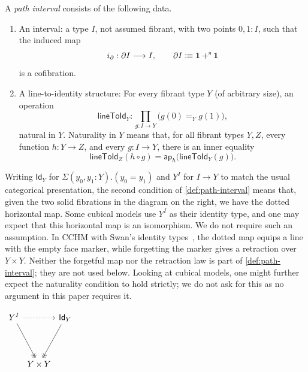 \begin{definition}\label{def:path-interval}
	A \emph{path interval} consists of the following data.
	\begin{enumerate}
		\item An interval: a type $I$, not assumed fibrant, with two points $0, 1: I$, such that the induced map
		\[
		i_\partial:\partial I\longrightarrow I,
		\qquad \partial I \mathrel{\vcentcolon\mspace{-1mu}\equiv} \mathbf{1} +^{\mathrm{s}} \mathbf{1}
		\]
		is a cofibration.
		\item A line-to-identity structure: For every fibrant type \(Y\) (of arbitrary size), an operation
		\[
		\mathsf{lineToId}_Y:
		\prod_{g:I\to Y}\bigl(g(0)=_Y g(1)\bigr),
		\]
		natural in \(Y\). Naturality in \(Y\) means that, for all fibrant types \(Y,Z\), every function
		\(h:Y\to Z\), and every \(g:I\to Y\), there is an inner equality
		\[
		\mathsf{lineToId}_Z(h\circ g)
		=
		\mathsf{ap}_h\bigl(\mathsf{lineToId}_Y(g)\bigr).
		\]
	\end{enumerate}
\end{definition}



\noindent
\begin{minipage}[t]{0.755\textwidth}
\begin{remark}\label{rem:path-interval-diagram}
Writing $\mathsf{Id}_Y$ for $\Sigma (y_0, y_1 : Y). (y_0 = y_1)$ and $Y^I$ for $I \to Y$ to match the usual categorical presentation, the second condition of \cref{def:path-interval} means that, given the two solid fibrations in the diagram on the right, we have the dotted horizontal map.
	Some cubical models use $Y^I$ as their identity type, and one may expect that this horizontal map is an isomorphism.
	We do not require such an assumption. In CCHM with Swan's identity types~\citep[\S9.1]{CCHM2018}, the dotted map equips a line with the empty face marker, while forgetting the marker gives a retraction over $Y\times Y$. Neither the forgetful map nor the retraction law is part of \cref{def:path-interval}; they are not used below.
	Looking at cubical models, one might further expect the naturality condition to hold strictly; we do not ask for this as no argument in this paper requires it.
\end{remark}
\end{minipage}\hfill
\begin{minipage}[t]{0.215\textwidth}
	\vspace{0.6\baselineskip}
	\centering
	$\begin{tikzcd}[column sep=0.1em, row sep=4em]
		Y^I  \ar[rr,dotted] \ar[dr,->>] && \mathsf{Id}_Y \ar[dl,->>]\\
		& Y \times Y
	\end{tikzcd}$
\end{minipage}

